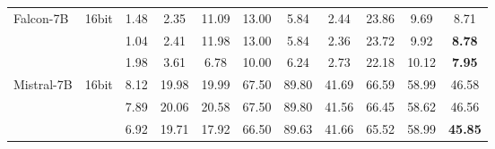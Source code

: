 \begin{table}[t]
{\begin{tabular}{llccccccccc}
\midrule
\multirow{3}{*}{Falcon-7B}      & 16bit  & 1.48 & 2.35 & 11.09 & 13.00 & 5.84 & 2.44 & 23.86 & 9.69 & 8.71 \\
                                & \kivifour{} & 1.04 & 2.41 & 11.98 & 13.00 & 5.84 & 2.36 & 23.72 & 9.92 & \textbf{8.78} \\
                                & \kivitwo{} & 1.98 & 3.61 & 6.78 & 10.00 & 6.24 & 2.73 & 22.18 & 10.12 & \textbf{7.95} \\
\midrule
\multirow{3}{*}{Mistral-7B}     & 16bit  & 8.12 & 19.98 & 19.99 & 67.50 & 89.80 & 41.69 & 66.59 & 58.99 & 46.58 \\
                                & \kivifour{} & 7.89 & 20.06 & 20.58 & 67.50 & 89.80 & 41.56 & 66.45 & 58.62 & 46.56 \\
                                & \kivitwo{} & 6.92 & 19.71 & 17.92 & 66.50 & 89.63& 41.66 & 65.52 & 58.99 & \textbf{45.85} \\
\bottomrule
\end{tabular}
}
\end{table}